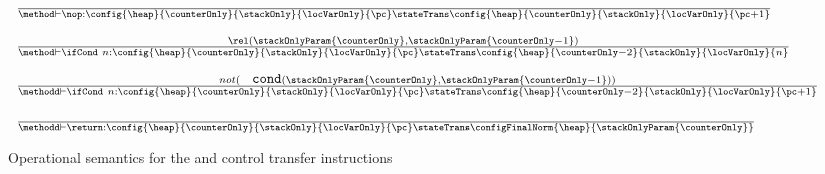 \begin{figure}[ht!] 
\begin{frameit}
 $$ \begin{array}{l}
\frac{ } 			       		               
                      {\method \vdash \nop : \config{\heap }{\counterOnly}{\stackOnly}{\locVarOnly}{\pc}
		                      \stateTrans 
				      \config{\heap}{\counterOnly}{\stackOnly}{\locVarOnly}{\pc+1}} 
 \\    \\
\small \frac{ \rel ( \stackOnlyParam{\counterOnly}, \stackOnlyParam{\counterOnly - 1}) } 			       		               
                      {\method \vdash \ifCond \ n : \config{\heap }{\counterOnly}{\stackOnly}{\locVarOnly}{\pc}
		                      \stateTrans 
				      \config{\heap}{\counterOnly - 2}{\stackOnly}{\locVarOnly}{n}} 
\\    \\
                 \frac{  not (\mbox{ \rm \texttt{ cond}}( \stackOnlyParam{\counterOnly}, \stackOnlyParam{\counterOnly - 1})) }		                             
                     {\methodd \vdash \ifCond \ n : \config{\heap}{\counterOnly}{\stackOnly}{\locVarOnly}{\pc} 
		                    \stateTrans 
                                    \config{\heap}{\counterOnly - 2}{\stackOnly}{\locVarOnly}{\pc + 1}} %
 \\ \\
 \frac{ } 
            {\methodd \vdash \return :\config{\heap}{\counterOnly}{\stackOnly}{\locVarOnly}{\pc} 
		                    \stateTrans 
                                    \configFinalNorm{\heap}{\stackOnlyParam{\counterOnly}}}   %
\end{array}
$$

\caption{\sc Operational semantics for the \nop{} and control transfer instructions}
\label{opSem:jump}
\end{frameit}
\end{figure}



